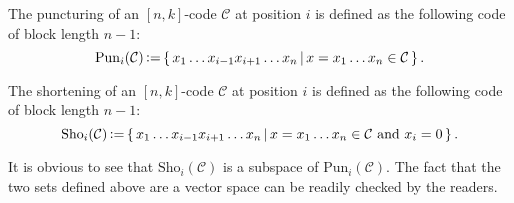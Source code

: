 \begin{definition}[Punturing]
    The puncturing of an $[n,k]$-code $\mathcal{C}$ at position $i$ is defined as the following code of block length $n-1$:
    \begin{equation}
        \mathrm{Pun}_i(\mathcal{C}) \operatorname{\vcentcolon=} \left\{\,{x_1\ldots x_{i-1}x_{i+1}\ldots x_n}\,\middle\vert\,{x=x_1\ldots x_n\in\mathcal{C}}\,\right\}.
    \end{equation}
\end{definition}
\begin{definition}[Shortening]
    The shortening of an $[n,k]$-code $\mathcal{C}$ at position $i$ is defined as the following code of block length $n-1$:
    \begin{equation}
        \mathrm{Sho}_i(\mathcal{C}) \operatorname{\vcentcolon=} \left\{\,{x_1\ldots x_{i-1}x_{i+1}\ldots x_n}\,\middle\vert\,{x=x_1\ldots x_n\in\mathcal{C} \text{ and } x_i=0}\,\right\}.
    \end{equation}
\end{definition}

It is obvious to see that $\mathrm{Sho}_i(\mathcal{C})$ is a subspace of $\mathrm{Pun}_i(\mathcal{C})$. The fact that the two sets defined above are a vector space can be readily checked by the readers.


